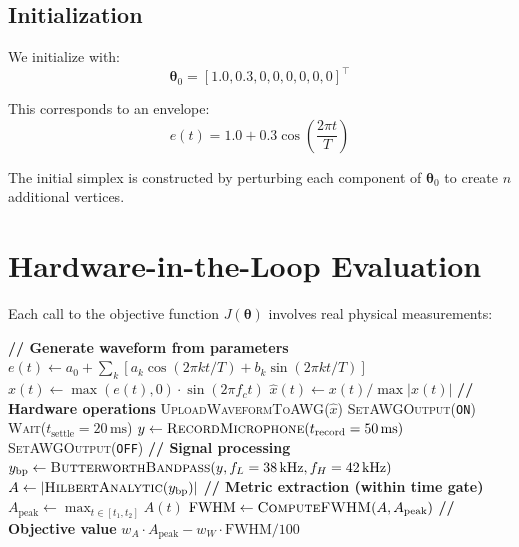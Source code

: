 \documentclass[11pt]{article}
\begin{document}
\subsection{Initialization}

We initialize with:
\begin{equation}
    \boldsymbol{\theta}_0 = [1.0, 0.3, 0, 0, 0, 0, 0, 0]^\top
\end{equation}

This corresponds to an envelope:
\begin{equation}
    e(t) = 1.0 + 0.3\cos\left(\frac{2\pi t}{T}\right)
\end{equation}

The initial simplex is constructed by perturbing each component of $\boldsymbol{\theta}_0$ to create $n$ additional vertices.

\section{Hardware-in-the-Loop Evaluation}

Each call to the objective function $J(\boldsymbol{\theta})$ involves real physical measurements:

\begin{algorithm}
\caption{Objective Function Evaluation}
\begin{algorithmic}[1]
    \State \textbf{// Generate waveform from parameters}
    \State $e(t) \gets a_0 + \sum_k [a_k \cos(2\pi k t/T) + b_k \sin(2\pi k t/T)]$
    \State $x(t) \gets \max(e(t), 0) \cdot \sin(2\pi f_c t)$
    \State $\hat{x}(t) \gets x(t) / \max|x(t)|$ 
    \State
    \State \textbf{// Hardware operations}
    \State \textsc{UploadWaveformToAWG}($\hat{x}$)
    \State \textsc{SetAWGOutput}(\texttt{ON})
    \State \textsc{Wait}($t_{\text{settle}} = 20\,\text{ms}$) 
    \State $y \gets \textsc{RecordMicrophone}(t_{\text{record}} = 50\,\text{ms})$
    \State \textsc{SetAWGOutput}(\texttt{OFF})
    \State
    \State \textbf{// Signal processing}
    \State $y_{\text{bp}} \gets \textsc{ButterworthBandpass}(y, f_L=38\,\text{kHz}, f_H=42\,\text{kHz})$
    \State $A \gets |\textsc{HilbertAnalytic}(y_{\text{bp}})|$ 
    \State
    \State \textbf{// Metric extraction (within time gate)}
    \State $A_{\text{peak}} \gets \max_{t \in [t_1, t_2]} A(t)$
    \State $\text{FWHM} \gets \textsc{ComputeFWHM}(A, A_{\text{peak}})$
    \State
    \State \textbf{// Objective value}
    \State \Return $w_A \cdot A_{\text{peak}} - w_W \cdot \text{FWHM}/100$
\EndProcedure
\end{algorithmic}
\end{algorithm}
\end{document}
